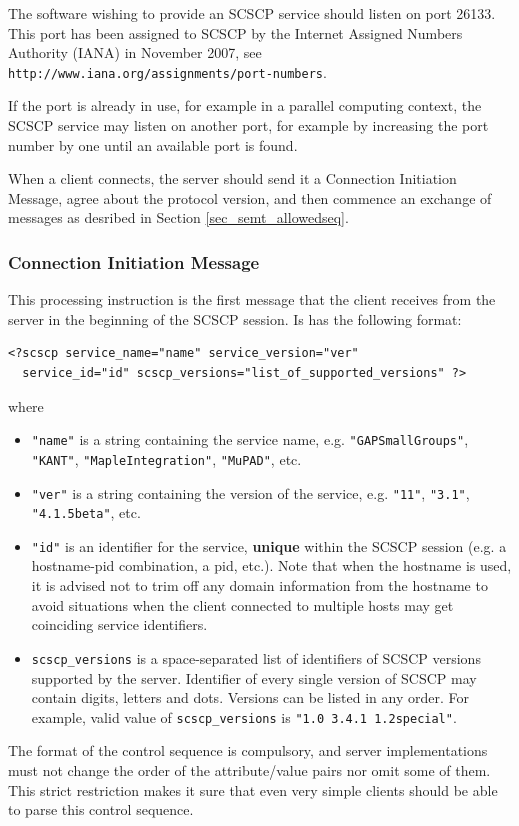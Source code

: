 \documentclass{amsart}
\begin{document}
The software wishing to provide an SCSCP service should listen on port 26133.
This port has been assigned to SCSCP by the Internet Assigned Numbers Authority 
(IANA) in November 2007, see \\ \verb|http://www.iana.org/assignments/port-numbers|. 

If the port is already in use, for example in a parallel computing context, the SCSCP
service may listen on another port, for example by increasing the port number by one
until an available port is found.

When a client connects, the server should send it a Connection Initiation
Message, agree about the protocol version, and then commence an
exchange of messages as desribed in Section \ref{sec_semt_allowedseq}.

\subsubsection{Connection Initiation Message}

This processing instruction is the first message that the client 
receives from the server in the beginning of the SCSCP session.
Is has the following format:
\begin{verbatim}
<?scscp service_name="name" service_version="ver" 
  service_id="id" scscp_versions="list_of_supported_versions" ?> 
\end{verbatim}
where
\begin{itemize}
\item {\tt "name"} is a string containing the service name, 
e.g. {\tt "GAPSmallGroups"}, {\tt "KANT"},  {\tt "MapleIntegration"}, {\tt "MuPAD"}, etc.
\item {\tt "ver"} is a string containing the version of the service, 
e.g. {\tt "11"}, {\tt "3.1"}, {\tt "4.1.5beta"}, etc.
\item {\tt "id"} is an identifier for the service, {\bf unique} within
the SCSCP session (e.g. a hostname-pid combination, a pid, etc.).
Note that when the hostname is used, it is advised not to trim off any domain 
information from the hostname to avoid situations when the client connected 
to multiple hosts may get coinciding service identifiers.
\item \verb|scscp_versions| is a space-separated list of identifiers of
SCSCP versions supported by the server. Identifier of every single 
version of SCSCP may contain digits, letters and dots. 
Versions can be listed in any order.
For example, valid value of \verb|scscp_versions| is
\verb|"1.0 3.4.1 1.2special"|.
\end{itemize}
The format of the control sequence is compulsory, and server implementations 
must not change the order of the attribute/value pairs nor omit some of them. 
This strict restriction makes it sure that even very simple clients should be 
able to parse this control sequence.
\end{document}

